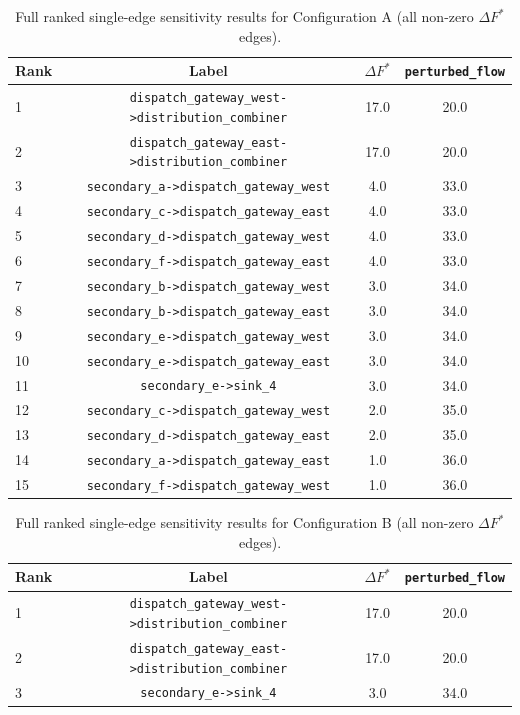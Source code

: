 \documentclass[12pt]{report}
\begin{document}
\begin{appendices}

\begin{table}[htbp]
\centering
\caption{Full ranked single-edge sensitivity results for Configuration A (all non-zero $\Delta F^*$ edges).}
\label{tab:critical_edges_config_a_appendix}
\begin{tabular}{lccc}
\toprule
Rank & Label & $\Delta F^*$ & \texttt{perturbed\_flow} \\
\midrule
1 & \texttt{dispatch\_gateway\_west->distribution\_combiner} & 17.0 & 20.0 \\
2 & \texttt{dispatch\_gateway\_east->distribution\_combiner} & 17.0 & 20.0 \\
3 & \texttt{secondary\_a->dispatch\_gateway\_west} & 4.0 & 33.0 \\
4 & \texttt{secondary\_c->dispatch\_gateway\_east} & 4.0 & 33.0 \\
5 & \texttt{secondary\_d->dispatch\_gateway\_west} & 4.0 & 33.0 \\
6 & \texttt{secondary\_f->dispatch\_gateway\_east} & 4.0 & 33.0 \\
7 & \texttt{secondary\_b->dispatch\_gateway\_west} & 3.0 & 34.0 \\
8 & \texttt{secondary\_b->dispatch\_gateway\_east} & 3.0 & 34.0 \\
9 & \texttt{secondary\_e->dispatch\_gateway\_west} & 3.0 & 34.0 \\
10 & \texttt{secondary\_e->dispatch\_gateway\_east} & 3.0 & 34.0 \\
11 & \texttt{secondary\_e->sink\_4} & 3.0 & 34.0 \\
12 & \texttt{secondary\_c->dispatch\_gateway\_west} & 2.0 & 35.0 \\
13 & \texttt{secondary\_d->dispatch\_gateway\_east} & 2.0 & 35.0 \\
14 & \texttt{secondary\_a->dispatch\_gateway\_east} & 1.0 & 36.0 \\
15 & \texttt{secondary\_f->dispatch\_gateway\_west} & 1.0 & 36.0 \\
\bottomrule
\end{tabular}
\end{table}

\begin{table}[htbp]
\centering
\caption{Full ranked single-edge sensitivity results for Configuration B (all non-zero $\Delta F^*$ edges).}
\label{tab:critical_edges_config_b_appendix}
\begin{tabular}{lccc}
\toprule
Rank & Label & $\Delta F^*$ & \texttt{perturbed\_flow} \\
\midrule
1 & \texttt{dispatch\_gateway\_west->distribution\_combiner} & 17.0 & 20.0 \\
2 & \texttt{dispatch\_gateway\_east->distribution\_combiner} & 17.0 & 20.0 \\
3 & \texttt{secondary\_e->sink\_4} & 3.0 & 34.0 \\
\bottomrule
\end{tabular}
\end{table}

\end{appendices}
\ifdefined\maindoc
\else
\end{document}
